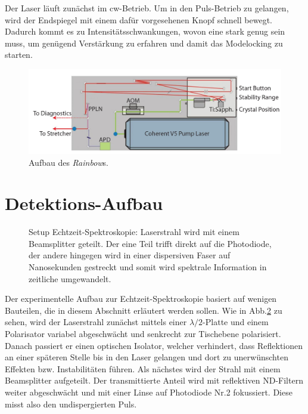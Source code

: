 \documentclass[bachelor,       %
               twoside,        %
               BCOR10mm,       %
               liststotoc,nomtotoc,bibtotoc, %
               english,ngerman, %
               final,          %
               ]{GAUBM}
\begin{document}
Der Laser läuft zunächst im cw-Betrieb.
Um in den Puls-Betrieb zu gelangen, wird der Endspiegel mit einem dafür vorgesehenen Knopf schnell bewegt.
Dadurch kommt es zu Intensitätsschwankungen, wovon eine stark genug sein muss, um genügend Verstärkung zu erfahren und damit das Modelocking zu starten.
\begin{figure}[!htb]
	\centering
	\includegraphics[width=\textwidth]{figures/rainbow2.JPG}
	\caption{Aufbau des \textit{Rainbow}s\protect\footnotemark.}
	\label{fig:rainbow}
\end{figure}
\section{Detektions-Aufbau}

\begin{figure}[!htb]
	\centering
	\def\svgwidth{\columnwidth}
	
	\caption{Setup Echtzeit-Spektroskopie: Laserstrahl wird mit einem Beamsplitter geteilt. Der eine Teil trifft direkt auf die Photodiode, der andere hingegen wird in einer dispersiven Faser auf Nanosekunden gestreckt und somit wird spektrale Information  in zeitliche  umgewandelt.}
	\label{fig:DFTSetup}
\end{figure}
Der experimentelle Aufbau zur Echtzeit-Spektroskopie basiert auf wenigen Bauteilen, die in diesem Abschnitt erläutert werden sollen.
Wie in Abb.\ref{fig:DFTSetup} zu sehen, wird der Laserstrahl zunächst mittels einer $\lambda/2$-Platte und einem Polarisator variabel abgeschwächt und senkrecht zur Tischebene polarisiert.
Danach passiert er einen optischen Isolator, welcher verhindert, dass Reflektionen an einer späteren Stelle bis in den Laser gelangen und dort zu unerwünschten Effekten bzw. Instabilitäten führen.
Als nächstes wird der Strahl mit einem Beamsplitter aufgeteilt.
Der transmittierte Anteil wird mit reflektiven ND-Filtern weiter abgeschwächt und mit einer Linse auf Photodiode Nr.2 fokussiert.
Diese misst also den undispergierten Puls.
\end{document}
